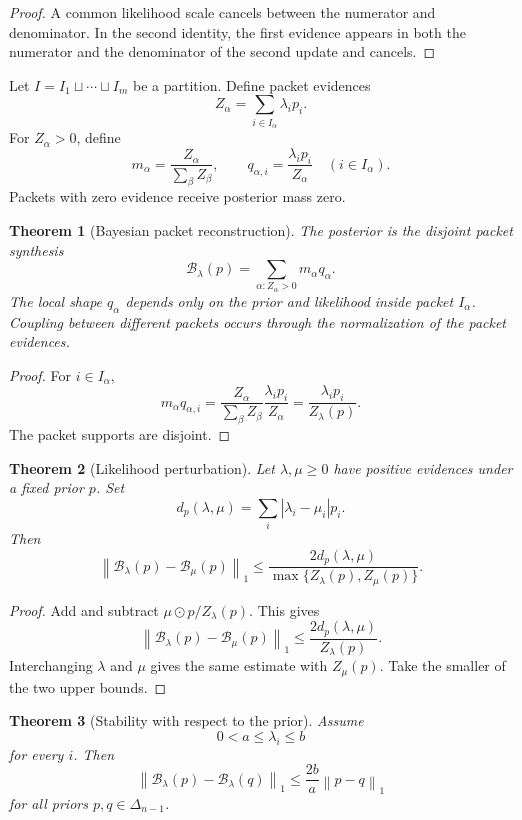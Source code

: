 \documentclass[11pt,letterpaper]{article}
\newtheorem{theorem}{Theorem}[section]
\theoremstyle{plain}
\theoremstyle{plain}
\theoremstyle{plain}
\theoremstyle{definition}
\theoremstyle{definition}
\theoremstyle{definition}
\theoremstyle{definition}
\theoremstyle{definition}
\theoremstyle{remark}
\theoremstyle{remark}
\theoremstyle{remark}
\theoremstyle{remark}
\theoremstyle{remark}
\newcommand{\norm}[1]{\left\lVert#1\right\rVert}
\theoremstyle{remark}
\newcommand{\Bcal}{\mathcal B}
\newcommand{\abs}[1]{\left\lvert#1\right\rvert}
\let\KomorebiPrimitiveMathcal\mathcal
\renewcommand{\mathcal}[1]{{\KomorebiPrimitiveMathcal{#1}}}
\begin{document}
\begin{proof}
A common likelihood scale cancels between the numerator and denominator. In the second identity, the first evidence appears in both the numerator and the denominator of the second update and cancels.
\end{proof}

Let \(I=I_1\sqcup\cdots\sqcup I_m\) be a partition. Define packet evidences
\[
Z_\alpha
=
\sum_{i\in I_\alpha}\lambda_ip_i.
\]
For \(Z_\alpha>0\), define
\[
m_\alpha=\frac{Z_\alpha}{\sum_\beta Z_\beta},
\qquad
q_{\alpha,i}=\frac{\lambda_ip_i}{Z_\alpha}
\quad(i\in I_\alpha).
\]
Packets with zero evidence receive posterior mass zero.

\begin{theorem}[Bayesian packet reconstruction]\label{extended:record:046}\label{extended:thm:bayesian_packet_reconstruction}
The posterior is the disjoint packet synthesis
\[
\Bcal_\lambda(p)
=
\sum_{\alpha:Z_\alpha>0}
m_\alpha q_\alpha.
\]
The local shape \(q_\alpha\) depends only on the prior and likelihood inside packet \(I_\alpha\). Coupling between different packets occurs through the normalization of the packet evidences.
\end{theorem}

\begin{proof}
For \(i\in I_\alpha\),
\[
m_\alpha q_{\alpha,i}
=
\frac{Z_\alpha}{\sum_\beta Z_\beta}
\frac{\lambda_ip_i}{Z_\alpha}
=
\frac{\lambda_ip_i}{Z_\lambda(p)}.
\]
The packet supports are disjoint.
\end{proof}

\begin{theorem}[Likelihood perturbation]\label{extended:record:047}\label{extended:thm:likelihood_perturbation}
Let \(\lambda,\mu\geq0\) have positive evidences under a fixed prior \(p\). Set
\[
d_p(\lambda,\mu)
=
\sum_i\abs{\lambda_i-\mu_i}p_i.
\]
Then
\[
\norm{\Bcal_\lambda(p)-\Bcal_\mu(p)}_1
\leq
\frac{2d_p(\lambda,\mu)}
{\max\{Z_\lambda(p),Z_\mu(p)\}}.
\]
\end{theorem}

\begin{proof}
Add and subtract \(\mu\odot p/Z_\lambda(p)\). This gives
\[
\norm{\Bcal_\lambda(p)-\Bcal_\mu(p)}_1
\leq
\frac{2d_p(\lambda,\mu)}{Z_\lambda(p)}.
\]
Interchanging \(\lambda\) and \(\mu\) gives the same estimate with \(Z_\mu(p)\). Take the smaller of the two upper bounds.
\end{proof}

\begin{theorem}[Stability with respect to the prior]\label{extended:record:048}\label{extended:thm:prior_stability}
Assume
\[
0<a\leq\lambda_i\leq b
\]
for every \(i\). Then
\[
\norm{\Bcal_\lambda(p)-\Bcal_\lambda(q)}_1
\leq
\frac{2b}{a}\norm{p-q}_1
\]
for all priors \(p,q\in\Delta_{n-1}\).
\end{theorem}
\end{document}
